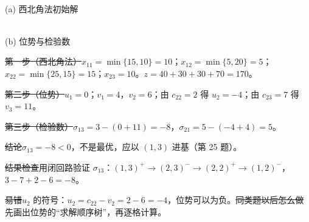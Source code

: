 \begin{center}
\begin{minipage}{0.47\linewidth}\centering
{}\\{\small (a) 西北角法初始解}
\end{minipage}\hfill
\begin{minipage}{0.5\linewidth}\centering
{}\\{\small (b) 位势与检验数}
\end{minipage}
\end{center}
\st{第一步（西北角法）}$x_{11}=\min\{15,10\}=10$；$x_{12}=\min\{5,20\}=5$；$x_{22}=\min\{25,15\}=15$；$x_{23}=10$。$z=40+30+30+70=170$。\par
\st{第二步（位势）}$u_1=0$；$v_1=4$，$v_2=6$；由 $c_{22}=2$ 得 $u_2=-4$；由 $c_{23}=7$ 得 $v_3=11$。\par
\st{第三步（检验数）}$\sigma_{13}=3-(0+11)=-8$，$\sigma_{21}=5-(-4+4)=5$。\par
\st{结论}$\sigma_{13}=-8<0$，不是最优，应以 $(1,3)$ 进基（第 25 题）。\par
\st{结果检查}用闭回路验证 $\sigma_{13}$：$(1,3)^+\to(2,3)^-\to(2,2)^+\to(1,2)^-$，$3-7+2-6=-8$。\par
\st{易错}$u_2$ 的符号：$u_2=c_{22}-v_2=2-6=-4$，位势可以为负。\quad\st{同类题以后怎么做}先画出位势的“求解顺序树”，再逐格计算。

